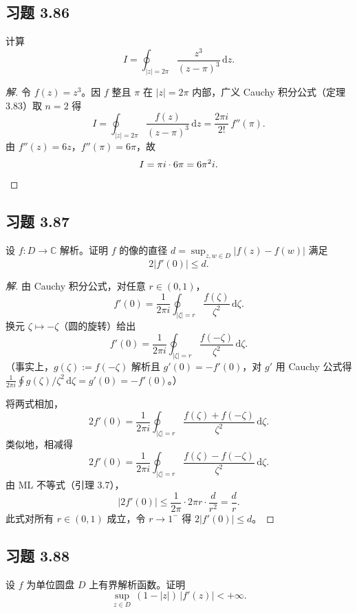 \documentclass[11pt,a4paper]{article}
\newcommand{\C}{\mathbb{C}}
\newcommand{\dd}{\mathrm{d}}
\theoremstyle{definition}
\newenvironment{solution}{\begin{proof}[解]}{\end{proof}}
\begin{document}
\subsection{习题 3.86}

计算
\[
  I = \oint_{|z|=2\pi} \frac{z^3}{(z-\pi)^3}\,\dd z.
\]

\begin{solution}
  令 $f(z) = z^3$。因 $f$ 整且 $\pi$ 在 $|z|=2\pi$ 内部，广义 Cauchy 积分公式（定理 3.83）取 $n=2$ 得
  \[
    I = \oint_{|z|=2\pi}\frac{f(z)}{(z-\pi)^3}\,\dd z
    = \frac{2\pi i}{2!}\,f''(\pi).
  \]
  由 $f''(z) = 6z$，$f''(\pi) = 6\pi$，故
  \[
    I = \pi i \cdot 6\pi = 6\pi^2 i.\qedhere
  \]
\end{solution}

\subsection{习题 3.87}

设 $f : D \to \C$ 解析。证明 $f$ 的像的直径 $d = \sup_{z,w \in D} |f(z) - f(w)|$ 满足
\[
  2|f'(0)| \le d.
\]

\begin{solution}
  由 Cauchy 积分公式，对任意 $r \in (0,1)$，
  \[
    f'(0) = \frac{1}{2\pi i}\oint_{|\zeta|=r}
    \frac{f(\zeta)}{\zeta^2}\,\dd\zeta.
  \]
  换元 $\zeta \mapsto -\zeta$（圆的旋转）给出
  \[
    f'(0) = \frac{1}{2\pi i}\oint_{|\zeta|=r}
    \frac{f(-\zeta)}{\zeta^2}\,\dd\zeta.
  \]
  （事实上，$g(\zeta) := f(-\zeta)$ 解析且 $g'(0) = -f'(0)$，对 $g'$ 用 Cauchy 公式得 $\frac{1}{2\pi i}\oint g(\zeta)/\zeta^2\,\dd\zeta = g'(0) = -f'(0)$。）

  将两式相加，
  \[
    2f'(0) = \frac{1}{2\pi i}\oint_{|\zeta|=r}
    \frac{f(\zeta)+f(-\zeta)}{\zeta^2}\,\dd\zeta.
  \]
  类似地，相减得
  \[
    2f'(0) = \frac{1}{2\pi i}\oint_{|\zeta|=r}
    \frac{f(\zeta)-f(-\zeta)}{\zeta^2}\,\dd\zeta.
  \]
  由 ML 不等式（引理 3.7），
  \[
    |2f'(0)|
    \le \frac{1}{2\pi}\cdot 2\pi r\cdot\frac{d}{r^2}
    = \frac{d}{r}.
  \]
  此式对所有 $r \in (0,1)$ 成立，令 $r \to 1^-$ 得 $2|f'(0)| \le d$。\qedhere
\end{solution}

\subsection{习题 3.88}

设 $f$ 为单位圆盘 $D$ 上有界解析函数。证明
\[
  \sup_{z \in D}\,(1 - |z|)\,|f'(z)| < +\infty.
\]
\end{document}
